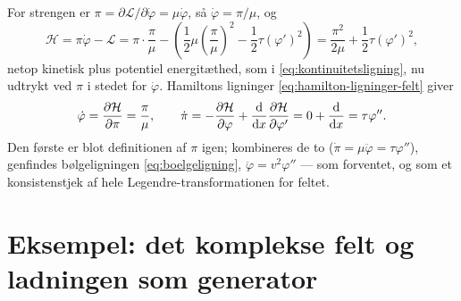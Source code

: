 \begin{eksempel}
For strengen er $\pi=\partial\mathcal{L}/\partial\dot\varphi=\mu\dot\varphi$,
så $\dot\varphi=\pi/\mu$, og
\begin{equation}
  \mathcal{H} = \pi\dot\varphi - \mathcal{L} = \pi\cdot\frac{\pi}{\mu}
    - \left(\frac12\mu\left(\frac{\pi}{\mu}\right)^2 - \frac12\tau(\varphi')^2\right)
  = \frac{\pi^2}{2\mu} + \frac12\tau(\varphi')^2,
\end{equation}
netop kinetisk plus potentiel energitæthed, som i
\eqref{eq:kontinuitetsligning}, nu udtrykt ved $\pi$ i stedet for
$\dot\varphi$. Hamiltons ligninger \eqref{eq:hamilton-ligninger-felt}
giver
\begin{equation}
  \dot\varphi = \pdv{\mathcal{H}}{\pi} = \frac{\pi}{\mu}, \qquad
  \dot\pi = -\pdv{\mathcal{H}}{\varphi} + \dv{}{x}\pdv{\mathcal{H}}{\varphi'}
          = 0 + \dv{}{x}(\tau\varphi') = \tau\varphi''.
\end{equation}
Den første er blot definitionen af $\pi$ igen; kombineres de to
($\dot\pi=\mu\ddot\varphi=\tau\varphi''$), genfindes bølgeligningen
\eqref{eq:boelgeligning}, $\ddot\varphi=v^2\varphi''$ — som forventet,
og som et konsistenstjek af hele Legendre-transformationen for feltet.
\end{eksempel}

\section{Eksempel: det komplekse felt og ladningen som generator}
\label{sec:komplekst-felt-hamilton}

